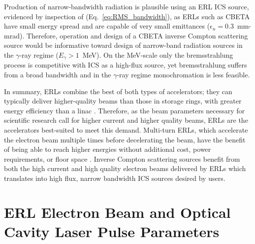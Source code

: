 \documentclass[../main.tex]{subfiles}
\begin{document}
Production of narrow-bandwidth radiation is plausible using an ERL ICS source, evidenced by inspection of (Eq.~\ref{eq:RMS_bandwidth}), as ERLs such as CBETA have small energy spread and are capable of very small emittances ($\epsilon_{n} = 0.3$~\si{\milli\meter}-\si{\milli\radian}). Therefore, operation and design of a CBETA inverse Compton scattering source would be informative toward design of narrow-band radiation sources in the $\gamma$-ray regime ($E_{\gamma} > 1$~\si{\mega\electronvolt}). On the \si{\mega\electronvolt}-scale only the bremsstrahlung process is competitive with ICS as a high-flux source, yet bremsstrahlung suffers from a broad bandwidth and in the $\gamma$-ray regime monochromation is less feasible.

In summary, ERLs combine the best of both types of accelerators; they can typically deliver higher-quality beams than those in storage rings, with greater energy efficiency than a linac \cite{smith2006optic}. Therefore, as the beam parameters necessary for scientific research call for higher current and higher quality beams, ERLs are the accelerators best-suited to meet this demand. Multi-turn ERLs, which accelerate the electron beam multiple times before decelerating the beam, have the benefit of being able to reach higher energies without additional cost, power requirements, or floor space \cite{merminga2003high}. Inverse Compton scattering sources benefit from both the high current and high quality electron beams delivered by ERLs which translates into high flux, narrow bandwidth ICS sources desired by users. 

\section{ERL Electron Beam and Optical Cavity Laser Pulse Parameters}
\end{document}
